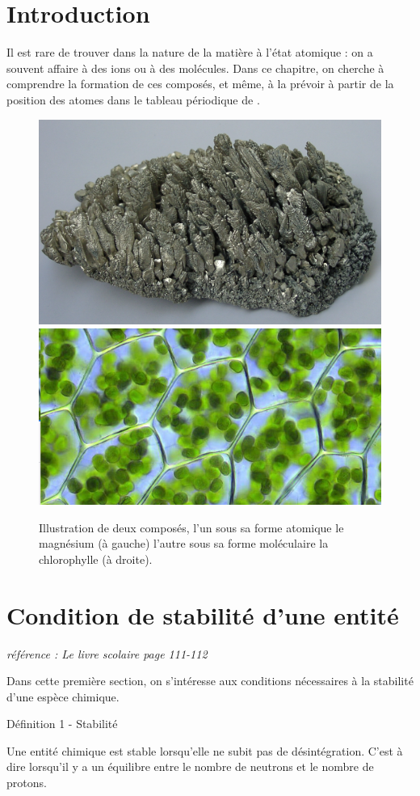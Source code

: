\documentclass[french, a4paper, 12pt]{article}
\begin{document}
\clearpage
\section*{Introduction}

Il est rare de trouver dans la nature de la matière à l'état atomique : on a souvent affaire à des ions ou à des molécules. Dans ce chapitre, on cherche à comprendre la formation de ces composés, et même, à la prévoir à partir de la position des atomes dans le tableau périodique de .

\begin{figure}[ht]
	\centering
	\includegraphics[width=.31\textwidth]{Magnesium.png}\hspace{2cm}
	\includegraphics[width=.38\textwidth]{chlorophylle.png}
	\caption{Illustration de deux composés, l'un sous sa forme atomique le magnésium (à gauche) l'autre sous sa forme moléculaire la chlorophylle (à droite).}
\end{figure}
\vspace{-.5cm}
\section{Condition de stabilité d'une entité}

\begin{center}
	\textit{référence : Le livre scolaire page 111-112}
\end{center}

Dans cette première section, on s'intéresse aux conditions nécessaires à la stabilité d'une espèce chimique.

\begin{definition}{Définition 1 - Stabilité}

Une entité chimique est stable lorsqu'elle ne subit pas de désintégration. C'est à dire lorsqu'il y a un équilibre entre le nombre de neutrons et le nombre de protons.

\end{definition}
\end{document}
